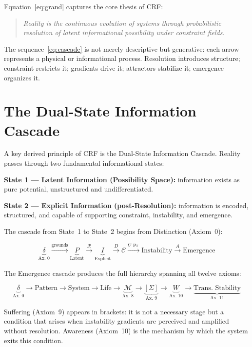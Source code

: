 \documentclass[12pt, a4paper]{article}
\begin{document}
Equation~\eqref{eq:grand} captures the core thesis of CRF:
\begin{quote}
\textit{Reality is the continuous evolution of systems through probabilistic resolution
of latent informational possibility under constraint fields.}
\end{quote}
The sequence~\eqref{eq:cascade} is not merely descriptive but generative: each arrow
represents a physical or informational process. Resolution introduces structure;
constraint restricts it; gradients drive it; attractors stabilize it; emergence
organizes it.

\section{The Dual-State Information Cascade}

A key derived principle of CRF is the Dual-State Information Cascade. Reality passes
through two fundamental informational states:

\textbf{State 1 --- Latent Information (Possibility Space):} information exists as pure
potential, unstructured and undifferentiated.

\textbf{State 2 --- Explicit Information (post-Resolution):} information is encoded,
structured, and capable of supporting constraint, instability, and emergence.

The cascade from State~1 to State~2 begins from Distinction (Axiom~0):

\[
  \underbrace{\delta}_{\text{Ax.~0}}
  \xrightarrow{\text{grounds}}
  \underbrace{P}_{\text{Latent}}
  \xrightarrow{\mathcal{R}}
  \underbrace{I}_{\text{Explicit}}
  \xrightarrow{D} \mathcal{C}
  \xrightarrow{\nabla\Pr} \text{Instability}
  \xrightarrow{A} \text{Emergence}
\]

The Emergence cascade produces the full hierarchy spanning all twelve axioms:

\[
  \underbrace{\delta}_{\text{Ax.~0}}
  \to \text{Pattern} \to \text{System} \to \text{Life}
  \to \underbrace{\mathcal{M}}_{\text{Ax.~8}}
  \to \underbrace{[\Sigma]}_{\text{Ax.~9}}
  \to \underbrace{W}_{\text{Ax.~10}}
  \to \underbrace{\text{Trans. Stability}}_{\text{Ax.~11}}
\]

Suffering (Axiom~9) appears in brackets: it is not a necessary stage but a condition
that arises when instability gradients are perceived and amplified without resolution.
Awareness (Axiom~10) is the mechanism by which the system exits this condition.
\end{document}
